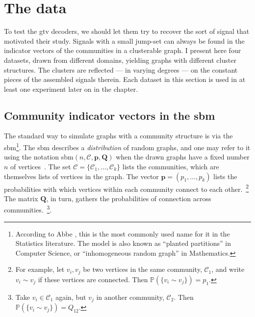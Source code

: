 \section{The data}

To test the \acrshort{gtv} decoders, we should let them try to recover the sort of signal that motivated their study. Signals with a small jump-set can always be found in the indicator vectors of the communities in a clusterable graph. I present here four datasets, drawn from different domains, yielding graphs with different cluster structures. The clusters are reflected --- in varying degrees --- on the constant pieces of the assembled signals therein. Each dataset in this section is used in at least one experiment later on in the chapter.

\subsection{Community indicator vectors in the \texorpdfstring{\acrlong{sbm}}{Stochastic Block Model}}

The standard way to simulate graphs with a community structure is via the \acrfull{sbm}\footnote{According to Abbe \cite{abbe2018}, this is the most commonly used name for it in the Statistics literature. The model is also known as ``planted partitions'' in Computer Science, or ``inhomogeneous random graph'' in Mathematics.}. The \acrshort{sbm} describes a \emph{distribution} of random graphs, and one may refer to it using the notation \acrshort{sbm}$(n, \mathcal{C}, \mathbf{p}, \mathbf{Q})$ when the drawn graphs have a fixed number $n$ of vertices~\cite{abbe2018}. The set $\mathcal{C} = \{\mathcal{C}_1 , \dots, \mathcal{C}_k \}$ lists the communities, which are themselves lists of vertices in the graph. The vector $\mathbf{p} = (p_1, \dots, p_k)$ lists the probabilities with which vertices within each community connect to each other.~\footnote{For example, let $v_i, v_j$ be two vertices in the same community, $\mathcal{C}_1$, and write $v_i \sim v_j$ if these vertices are connected. Then $\mathbb{P} ( \{  v_i \sim v_j \}) = p_1$.} The matrix $\mathbf{Q}$, in turn, gathers the probabilities of connection across communities.~\footnote{Take $v_i \in \mathcal{C}_1$ again, but $v_j$ in another community, $\mathcal{C}_2$. Then $\mathbb{P} ( \{  v_i \sim v_j \}) = Q_{12}$.}.

